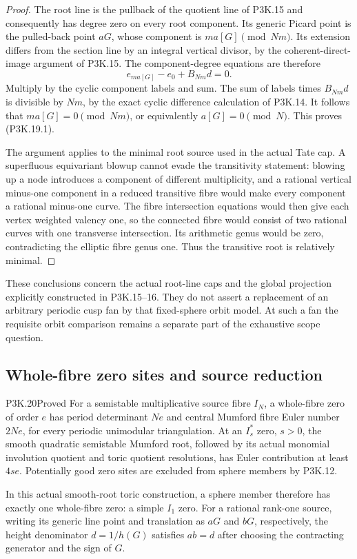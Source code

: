 \begin{proof}
The root line is the pullback of the quotient line of
P3K.15 and consequently has degree zero on every root
component.  Its generic Picard point is the pulled-back
point \(aG\), whose component is \(ma[G]\pmod{Nm}\).
Its extension differs from the section line by an integral
vertical divisor, by the coherent-direct-image argument
of P3K.15.  The component-degree equations are therefore
\[
                  e_{ma[G]}-e_0+B_{Nm}d=0.
\]
Multiply by the cyclic component labels and sum.  The
sum of labels times \(B_{Nm}d\) is divisible by \(Nm\),
by the exact cyclic difference calculation of P3K.14.
It follows that \(ma[G]=0\pmod{Nm}\), or equivalently
\(a[G]=0\pmod N\).  This proves (P3K.19.1).

The argument applies to the minimal root source used in
the actual Tate cap.  A superfluous equivariant blowup
cannot evade the transitivity statement: blowing up a
node introduces a component of different multiplicity,
and a rational vertical minus-one component in a reduced
transitive fibre would make every component a rational
minus-one curve.  The fibre intersection equations would
then give each vertex weighted valency one, so the
connected fibre would consist of two rational curves
with one transverse intersection.  Its arithmetic genus
would be zero, contradicting the elliptic fibre genus
one.  Thus the transitive root is relatively minimal.
\end{proof}

These conclusions concern the actual root-line caps and the
global projection explicitly constructed in P3K.15–16.  They
do not assert a replacement of an arbitrary periodic cusp fan
by that fixed-sphere orbit model.  At such a fan the requisite
orbit comparison remains a separate part of the exhaustive
scope question.

\subsection{Whole-fibre zero sites and source reduction}

\begin{statement}{P3K.20}{Proved}
For a semistable multiplicative source fibre \(I_N\), a
whole-fibre zero of order \(e\) has period determinant
\(Ne\) and central Mumford fibre Euler number \(2Ne\),
for every periodic unimodular triangulation.  At an
\(I_s^*\) zero, \(s>0\), the smooth quadratic
semistable Mumford root, followed by its actual monomial
involution quotient and toric quotient resolutions, has
Euler contribution at least \(4se\).  Potentially good
zero sites are excluded from sphere members by P3K.12.

In this actual smooth-root toric construction, a sphere
member therefore has exactly one whole-fibre zero: a
simple \(I_1\) zero.  For a rational rank-one source,
writing its generic line point and translation as
\(aG\) and \(bG\), respectively, the height denominator
\(d=1/h(G)\) satisfies \(ab=d\) after choosing the
contracting generator and the sign of \(G\).
\end{statement}

